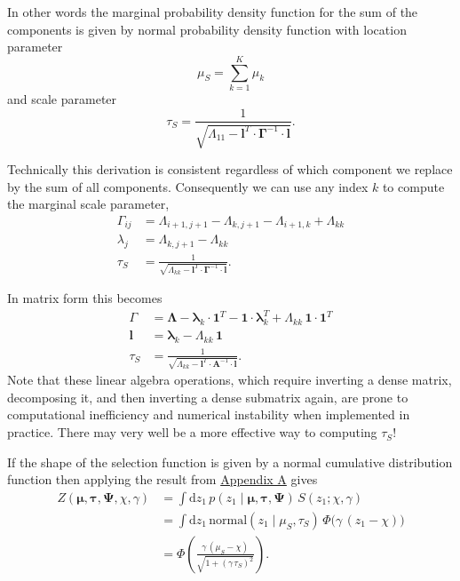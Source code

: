 \documentclass[
  letterpaper,
  DIV=11,
  numbers=noendperiod]{scrartcl}
\begin{document}
In other words the marginal probability density function for the sum of
the components is given by normal probability density function with
location parameter \[
\mu_{S} = \sum_{k = 1}^{K} \mu_{k}
\] and scale parameter \[
\tau_{S} =
\frac{1}{\sqrt{  \Lambda_{11}
               - \mathbf{l}^{T} \cdot
                 \boldsymbol{\Gamma}^{-1} \cdot
                 \mathbf{l} }}.
\]

Technically this derivation is consistent regardless of which component
we replace by the sum of all components. Consequently we can use any
index \(k\) to compute the marginal scale parameter, \begin{align*}
\Gamma_{ij}
&=
\Lambda_{i + 1,j + 1} - \Lambda_{k,j+1} - \Lambda_{i + 1,k} + \Lambda_{kk}
\\
\lambda_{j}
&=
\Lambda_{k,j+1} - \Lambda_{kk}
\\
\tau_{S}
&=
\frac{1}{ \sqrt{ \Lambda_{kk} - \mathbf{l}^{T} \cdot
                                \boldsymbol{\Gamma}^{-1} \cdot
                                \mathbf{l} } }.
\end{align*}

In matrix form this becomes \begin{align*}
\Gamma
&=
\boldsymbol{\Lambda}
- \boldsymbol{\lambda}_{k} \cdot \mathbf{1}^{T}
- \mathbf{1} \cdot \boldsymbol{\lambda}_{k}^{T}
+ \Lambda_{kk} \, \mathbf{1} \cdot \mathbf{1}^{T}
\\
\mathbf{l}
&=
\boldsymbol{\lambda}_{k} - \Lambda_{kk} \, \mathbf{1}
\\
\tau_{S}
&=
\frac{1}
{ \sqrt{   \Lambda_{kk}
         - \mathbf{l}^{T} \cdot \mathbf{A}^{-1} \cdot \mathbf{l} } }.
\end{align*} Note that these linear algebra operations, which require
inverting a dense matrix, decomposing it, and then inverting a dense
submatrix again, are prone to computational inefficiency and numerical
instability when implemented in practice. There may very well be a more
effective way to computing \(\tau_{S}\)!

If the shape of the selection function is given by a normal cumulative
distribution function then applying the result from
\href{@sec:appendix_uni}{Appendix A} gives \begin{align*}
Z (\boldsymbol{\mu}, \boldsymbol{\tau}, \boldsymbol{\Psi}, \chi, \gamma)
&=
\int \mathrm{d} z_{1} \,
p(z_{1} \mid \boldsymbol{\mu}, \boldsymbol{\tau}, \boldsymbol{\Psi}) \,
S \left( z_{1}; \chi, \gamma \right)
\\
&=
\int \mathrm{d} z_{1} \,
\text{normal}(z_{1} \mid \mu_{S}, \tau_{S}) \,
\Phi \big( \gamma \, (z_{1} - \chi) \big)
\\
&=
\Phi \left( \frac{ \gamma \, (\mu_{S} - \chi) }
                 { \sqrt{1 + (\gamma \, \tau_{S})^{2} } } \right).
\end{align*}
\end{document}
